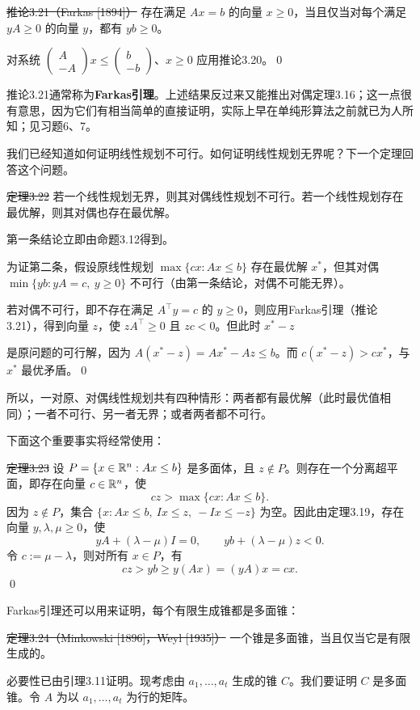 \st{推论3.21（Farkas [1894]）} 存在满足 $Ax=b$ 的向量 $x\ge0$，当且仅当对每个满足 $yA\ge0$ 的向量 $y$，都有 $yb\ge0$。

\pr 对系统 $\begin{pmatrix}A\\-A\end{pmatrix}x\le\begin{pmatrix}b\\-b\end{pmatrix}$、$x\ge0$ 应用推论3.20。\qed

推论3.21通常称为\textbf{Farkas引理}。上述结果反过来又能推出对偶定理3.16；这一点很有意思，因为它们有相当简单的直接证明，实际上早在单纯形算法之前就已为人所知；见习题6、7。

我们已经知道如何证明线性规划不可行。如何证明线性规划无界呢？下一个定理回答这个问题。

\st{定理3.22} 若一个线性规划无界，则其对偶线性规划不可行。若一个线性规划存在最优解，则其对偶也存在最优解。

\pr 第一条结论立即由命题3.12得到。

为证第二条，假设原线性规划 $\max\{cx:Ax\le b\}$ 存在最优解 $x^*$，但其对偶 $\min\{yb:yA=c,\ y\ge0\}$ 不可行（由第一条结论，对偶不可能无界）。

若对偶不可行，即不存在满足 $A^\top y=c$ 的 $y\ge0$，则应用Farkas引理（推论3.21），得到向量 $z$，使 $zA^\top\ge0$ 且 $zc<0$。但此时 $x^*-z$

是原问题的可行解，因为 $A(x^*-z)=Ax^*-Az\le b$。而 $c(x^*-z)>cx^*$，与 $x^*$ 最优矛盾。\qed

所以，一对原、对偶线性规划共有四种情形：两者都有最优解（此时最优值相同）；一者不可行、另一者无界；或者两者都不可行。

下面这个重要事实将经常使用：

\st{定理3.23} 设 $P=\{x\in\mathbb R^n:Ax\le b\}$ 是多面体，且 $z\notin P$。则存在一个分离超平面，即存在向量 $c\in\mathbb R^n$，使
\[
cz>\max\{cx:Ax\le b\}.
\]
\pr 因为 $z\notin P$，集合 $\{x:Ax\le b,\ Ix\le z,\ -Ix\le-z\}$ 为空。因此由定理3.19，存在向量 $y,\lambda,\mu\ge0$，使
\[
yA+(\lambda-\mu)I=0,\qquad yb+(\lambda-\mu)z<0.
\]
令 $c:=\mu-\lambda$，则对所有 $x\in P$，有
\[
cz>yb\ge y(Ax)=(yA)x=cx.
\]\qed

Farkas引理还可以用来证明，每个有限生成锥都是多面锥：

\st{定理3.24（Minkowski [1896]，Weyl [1935]）} 一个锥是多面锥，当且仅当它是有限生成的。

\pr 必要性已由引理3.11证明。现考虑由 $a_1,\ldots,a_t$ 生成的锥 $C$。我们要证明 $C$ 是多面锥。令 $A$ 为以 $a_1,\ldots,a_t$ 为行的矩阵。

